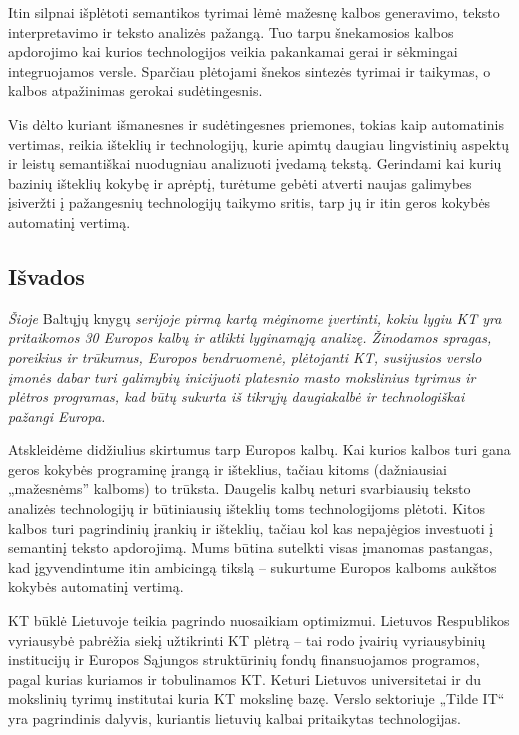 \documentclass[]{../metanetpaper}
\begin{document}
\begin{multicols}{2}
  Itin silpnai išplėtoti semantikos tyrimai lėmė mažesnę kalbos generavimo, teksto interpretavimo ir teksto analizės pažangą. Tuo tarpu šnekamosios kalbos apdorojimo kai kurios technologijos veikia pakankamai gerai ir sėkmingai integruojamos versle. Sparčiau plėtojami šnekos sintezės tyrimai ir taikymas, o kalbos atpažinimas gerokai sudėtingesnis.   

    Vis dėlto kuriant išmanesnes ir sudėtingesnes priemones, tokias kaip automatinis vertimas, reikia išteklių ir technologijų, kurie apimtų daugiau lingvistinių aspektų ir leistų semantiškai  nuodugniau analizuoti įvedamą tekstą. Gerindami kai kurių bazinių išteklių kokybę ir aprėptį, turėtume gebėti atverti naujas galimybes įsiveržti į pažangesnių technologijų taikymo sritis, tarp jų ir itin geros kokybės automatinį vertimą.

\subsection{Išvados}

\emph{Šioje} Baltųjų knygų \emph{serijoje pirmą kartą mėginome įvertinti, kokiu lygiu KT yra pritaikomos 30 Europos kalbų ir atlikti lyginamąją analizę. Žinodamos spragas, poreikius ir trūkumus, Europos bendruomenė, plėtojanti KT, susijusios verslo įmonės dabar turi galimybių inicijuoti platesnio masto mokslinius tyrimus ir plėtros programas, kad būtų sukurta iš tikrųjų daugiakalbė ir technologiškai pažangi Europa.}

Atskleidėme didžiulius skirtumus tarp Europos kalbų. Kai kurios kalbos turi gana geros kokybės programinę įrangą ir išteklius, tačiau kitoms (dažniausiai „mažesnėms” kalboms) to trūksta. Daugelis kalbų neturi svarbiausių teksto analizės technologijų ir būtiniausių išteklių toms technologijoms plėtoti. Kitos kalbos turi pagrindinių įrankių ir išteklių, tačiau kol kas nepajėgios investuoti į semantinį teksto apdorojimą. Mums būtina sutelkti visas įmanomas pastangas, kad įgyvendintume itin ambicingą tikslą – sukurtume Europos kalboms aukštos kokybės automatinį vertimą.   

    KT būklė Lietuvoje teikia pagrindo nuosaikiam optimizmui. Lietuvos Respublikos vyriausybė pabrėžia siekį užtikrinti KT plėtrą – tai rodo įvairių vyriausybinių institucijų ir Europos Sąjungos struktūrinių fondų finansuojamos programos, pagal kurias kuriamos ir tobulinamos KT. Keturi Lietuvos universitetai ir du mokslinių tyrimų institutai kuria KT mokslinę bazę. Verslo sektoriuje „Tilde IT“ yra pagrindinis dalyvis, kuriantis lietuvių kalbai pritaikytas technologijas.   


\end{multicols}
\end{document}
